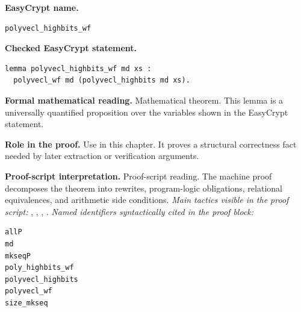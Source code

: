 \begin{formaltheorem}
\noindent\textbf{EasyCrypt name.}
\begin{lstlisting}[language=EasyCrypt,basicstyle=\ttfamily\scriptsize]
polyvecl_highbits_wf
\end{lstlisting}
\noindent\textbf{Checked EasyCrypt statement.}
\begin{lstlisting}[language=EasyCrypt,basicstyle=\ttfamily\scriptsize]
lemma polyvecl_highbits_wf md xs :
  polyvecl_wf md (polyvecl_highbits md xs).
\end{lstlisting}
\noindent\textbf{Formal mathematical reading.}
Mathematical theorem. This lemma is a universally quantified proposition over the variables shown in the EasyCrypt statement.

\noindent\textbf{Role in the proof.}
Use in this chapter. It proves a structural correctness fact needed by later extraction or verification arguments.

\noindent\textbf{Proof-script interpretation.}
Proof-script reading. The machine proof decomposes the theorem into rewrites, program-logic obligations, relational equivalences, and arithmetic side conditions.
\emph{Main tactics visible in the proof script:} , , , .
\emph{Named identifiers syntactically cited in the proof block:}
\begin{lstlisting}[language=EasyCrypt,basicstyle=\ttfamily\scriptsize]
allP
md
mkseqP
poly_highbits_wf
polyvecl_highbits
polyvecl_wf
size_mkseq
\end{lstlisting}

\end{formaltheorem}

